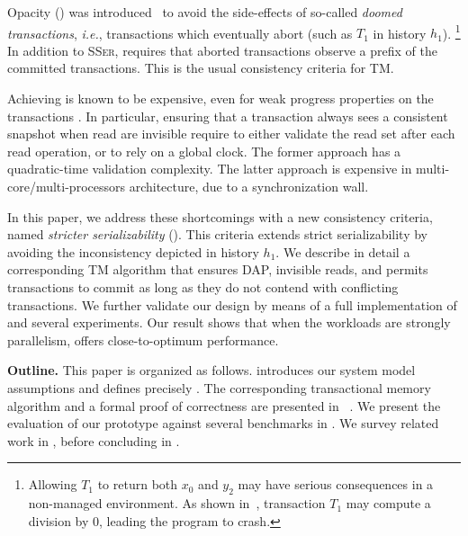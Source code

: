 Opacity (\opa) was introduced~\cite{guerraoui2008correctness} to avoid the side-effects of so-called \emph{doomed transactions}, \emph{i.e.}, transactions which eventually abort (such as $T_1$ in history $h_1$).%
\footnote{  
  Allowing $T_1$ to return both $x_0$ and $y_2$ may have serious consequences in a non-managed environment.
  As shown in~\cite{guerraoui2008correctness}, transaction $T_1$ may compute a division by $0$, leading the program to crash.
}
In addition to \textsc{SSer}, \opa requires that aborted transactions observe a prefix of the committed transactions.
This is the usual consistency criteria for TM.

Achieving \opa is known to be expensive, even for weak progress properties on the transactions \cite{}.
In particular, ensuring that a transaction always sees a consistent snapshot when read are invisible require to either validate the read set after each read operation, or to rely on a global clock.
The former approach has a quadratic-time validation complexity.
The latter approach is expensive in multi-core/multi-processors architecture, due to a synchronization wall.

In this paper, we address these shortcomings with a new consistency criteria, named \emph{stricter serializability} (\sser).
This criteria extends strict serializability by avoiding the inconsistency depicted in history $h_1$.
We describe in detail a corresponding TM algorithm that ensures DAP, invisible reads, and permits transactions to commit as long as they do not contend with conflicting transactions.
We further validate our design by means of a full implementation of \sser and several experiments.
Our result shows that when the workloads are strongly parallelism, \sser offers close-to-optimum performance.

\textbf{Outline.}
This paper is organized as follows.
 introduces our system model assumptions and defines precisely \sser.
The corresponding transactional memory algorithm and a formal proof of correctness are presented in ~.
We present the evaluation of our prototype against several benchmarks in .
We survey related work in , before concluding in .
